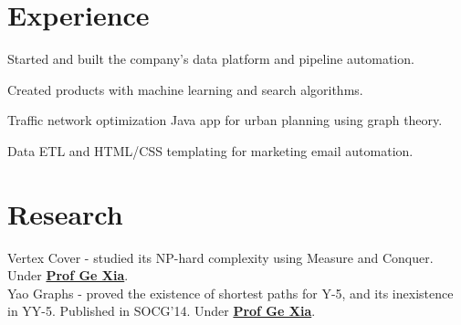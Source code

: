 \documentclass{deedy-resume-openfont}
\begin{document}
\hfill
\begin{minipage}[t]{0.66\textwidth}


\section{Experience}
\vspace{\topsep} %
\begin{tightemize}
\item Started and built the company's data platform and pipeline automation.
\item Created products with machine learning and search algorithms.
\end{tightemize}
\sectionsep

\begin{tightemize}
\item Traffic network optimization Java app for urban planning using graph theory.
\end{tightemize}
\sectionsep

\begin{tightemize}
\item Data ETL and HTML/CSS templating for marketing email automation.
\end{tightemize}
\sectionsep



\section{Research}
Vertex Cover - studied its NP-hard complexity using Measure and Conquer. Under \textbf{\href{http://www.cs.lafayette.edu/~gexia/}{Prof Ge Xia}}. \\
\sectionsep
{}
Yao Graphs - proved the existence of shortest paths for Y-5, and its inexistence in YY-5. Published in SOCG'14. Under \textbf{\href{http://www.cs.lafayette.edu/~gexia/}{Prof Ge Xia}}.
\sectionsep



\end{minipage}
\end{document}
